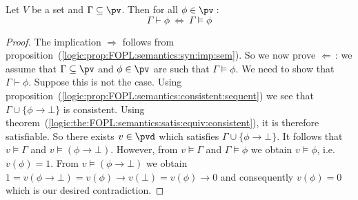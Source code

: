 \begin{theorem}\label{logic:the:FOPL:semantics:syn:equiv:sem}
Let $V$ be a set and $\Gamma\subseteq\pv$. Then for all
$\phi\in\pv$\,:
    \begin{equation}\label{logic:eqn:FOPL:semantics:syn:equiv:sem:1}
    \Gamma\vdash\phi\ \Leftrightarrow\ \Gamma\vDash\phi
    \end{equation}
\end{theorem}
\begin{proof}
The implication $\Rightarrow$ follows from
proposition~(\ref{logic:prop:FOPL:semantics:syn:imp:sem}). So we now
prove $\Leftarrow$\,: we assume that $\Gamma\subseteq\pv$ and
$\phi\in\pv$ are such that $\Gamma\vDash\phi$. We need to show that
$\Gamma\vdash\phi$. Suppose this is not the case. Using
proposition~(\ref{logic:prop:FOPL:semantics:consistent:sequent}) we
see that $\Gamma\cup\{\phi\to\bot\}$ is consistent. Using
theorem~(\ref{logic:the:FOPL:semantics:satis:equiv:consistent}), it
is therefore satisfiable. So there exists $v\in\pvd$ which satisfies
$\Gamma\cup\{\phi\to\bot\}$. It follows that $v\vDash\Gamma$ and
$v\vDash(\phi\to\bot)$. However, from $v\vDash\Gamma$ and
$\Gamma\vDash\phi$ we obtain $v\vDash\phi$, i.e. $v(\phi)=1$. From
$v\vDash(\phi\to\bot)$ we obtain $1=v(\phi\to\bot)=v(\phi)\to
v(\bot)=v(\phi)\to 0$ and consequently $v(\phi)=0$ which is our
desired contradiction.
\end{proof}
